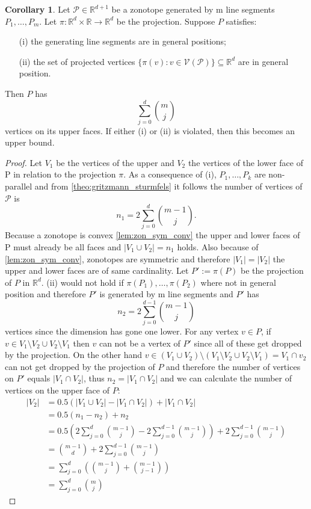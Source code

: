 \documentclass{article}
\theoremstyle{definition}
\newtheorem{corollary}[theorem]{Corollary}
\begin{document}
\begin{corollary}\hspace{1sp}\cite[p.~4]{zhang2018tropical}
\label{cor:zon_lines}
Let $\mathcal{P} \in \mathbb{R}^{d+1}$ be a zonotope generated by m line segments $P_1 , \dots , P_m$. Let $\pi : \mathbb{R}^{d} \times \mathbb{R} \to \mathbb{R}^{d}$ be the projection. Suppose $P$ satisfies:
\begin{itemize}
\item[(i)]
the generating line segments are in general positions;
\item[(ii)]
the set of projected vertices $\{ \pi(v) : v \in \mathcal{V}(\mathcal{P}) \} \subseteq \mathbb{R}^{d}$ are in general position.
\end{itemize}
Then $P$ has
$$ \sum_{j=0}^{d} \binom{m}{j} $$
vertices on its upper faces. If either (i) or (ii) is violated, then this becomes an upper bound.
\end{corollary}
\begin{proof}
Let $V_{1}$ be the vertices of the upper and $V_{2}$ the vertices of the lower face of P in relation to the projection $\pi$. As a consequence of (i), $P_{1}, \dots , P_{k}$ are non-parallel and from \ref{theo:gritzmann_sturmfels} it follows the number of vertices of $\mathcal{P}$ is 
$$n_{1} = 2 \sum^{d}_{j=0} \binom{m-1}{j}.$$
Because a zonotope is convex \ref{lem:zon_sym_conv} the upper and lower faces of P must already be all faces and $|V_{1} \cup V_{2}| = n_{1}$ holds. Also because of \ref{lem:zon_sym_conv}, zonotopes are symmetric and therefore $|V_{1}| = |V_{2}|$ the upper and lower faces are of same cardinality. Let $P' := \pi (P)$ be the projection of $P$ in $\mathbb{R}^{d}$. (ii) would not hold if $\pi(P_{1}), \dots , \pi(P_{2})$ where not in general position and therefore $P'$ is generated by m line segments and $P'$ has 
$$n_{2}=2 \sum^{d-1}_{j=0} \binom{m-1}{j}$$
vertices since the dimension has gone one lower. For any vertex $v \in P$, if $v \in V_{1} \setminus V_{2} \cup V_{2} \setminus V_{1}$ then $v$ can not be a vertex of $P'$ since all of these get dropped by the projection. On the other hand $v \in (V_{1} \cup V_{2}) \setminus (V_{1} \setminus V_{2} \cup V_{2} \setminus V_{1}) = V_{1} \cap v_{2}$ can not get dropped by the projection of $P$ and therefore the number of vertices on $P'$ equals $|V_{1} \cap V_{2}|$, thus $n_{2} = |V_{1} \cap V_{2}|$ and we can calculate the number of vertices on the upper face of $P$:
\begin{align*}
|V_{2}|
&= 0.5(|V_{1} \cup V_{2}| - |V_{1} \cap V_{2}|) + |V_{1} \cap V_{2}| \\
&= 0.5(n_{1} - n_{2}) + n_{2} \\
&= 0.5(2 \sum^{d}_{j=0} \binom{m-1}{j} - 2 \sum^{d-1}_{j=0} \binom{m-1}{j}) + 2 \sum^{d-1}_{j=0} \binom{m-1}{j} \\
&= \binom{m-1}{d} + 2 \sum^{d-1}_{j=0} \binom{m-1}{j} \\
&= \sum^{d}_{j=0}(\binom{m-1}{j} + \binom{m-1}{j-1}) \\
&= \sum^{d}_{j=0} \binom{m}{j}
\end{align*}
\end{proof}
\end{document}
